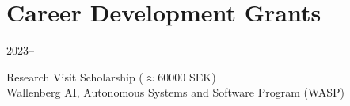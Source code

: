 \section*{Career Development Grants}
\begin{labeling}{2023--}
    \item [2023] Research Visit Scholarship ($\approx \num{60000}$ SEK)\\
        Wallenberg AI, Autonomous Systems and Software Program (WASP)

\end{labeling}

